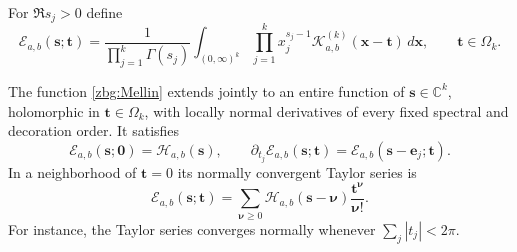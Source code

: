 For $\Re s_j>0$ define
\begin{equation}\label{zbg:Mellin}
 \mathscr E_{a,b}(\boldsymbol s;\boldsymbol t)
 =\frac1{\prod_{j=1}^k\Gamma(s_j)}
   \int_{(0,\infty)^k}\prod_{j=1}^k x_j^{s_j-1}
      \mathscr K_{a,b}^{(k)}(\boldsymbol x-\boldsymbol t)
           \,d\boldsymbol x,\qquad\boldsymbol t\in\Omega_k.
\end{equation}

\begin{theorem}
\label{zbg:entire}
The function \eqref{zbg:Mellin} extends jointly to an entire function
of $\boldsymbol s\in\mathbb C^k$, holomorphic in
$\boldsymbol t\in\Omega_k$, with locally normal derivatives of
every fixed spectral and decoration order.  It satisfies
\begin{equation}\label{zbg:lowering}
 \mathscr E_{a,b}(\boldsymbol s;\boldsymbol0)
       =\mathcal H_{a,b}(\boldsymbol s),\qquad
 \partial_{t_j}\mathscr E_{a,b}(\boldsymbol s;\boldsymbol t)
       =\mathscr E_{a,b}(\boldsymbol s-\boldsymbol e_j;\boldsymbol t).
\end{equation}
In a neighborhood of $\boldsymbol t=0$ its normally convergent Taylor
series is
\begin{equation}\label{zbg:Taylor}
 \mathscr E_{a,b}(\boldsymbol s;\boldsymbol t)
 =\sum_{\boldsymbol\nu\geq0}
     \mathcal H_{a,b}(\boldsymbol s-\boldsymbol\nu)
                          \frac{\boldsymbol t^{\boldsymbol\nu}}{\boldsymbol\nu!}.
\end{equation}
For instance, the Taylor series converges normally whenever
$\sum_j|t_j|<2\pi$.
\end{theorem}

